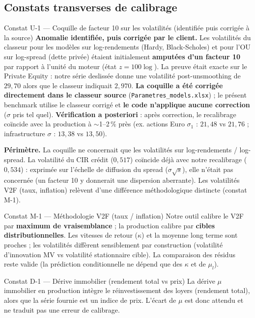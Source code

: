 \documentclass[11pt,a4paper]{article}
\begin{document}
\subsection{Constats transverses de calibrage}
\begin{findingbox}{Constat U-1 --- Coquille de facteur 10 sur les volatilit\'es (identifi\'ee puis corrig\'ee \`a la source)}
\textbf{Anomalie identifi\'ee, puis corrig\'ee par le client.} Les volatilit\'es
du classeur pour les mod\`eles sur log-rendements (Hardy, Black-Scholes) et pour
l'OU sur log-spread (dette priv\'ee) \'etaient initialement \textbf{amput\'ees
d'un facteur 10} par rapport \`a l'unit\'e du moteur (\'etat $z=100\log$). La
preuve \'etait exacte sur le Private Equity : notre s\'erie deslissée donne une
volatilit\'e post-unsmoothing de $29{,}70$ alors que le classeur indiquait
$2{,}970$. \textbf{La coquille a \'et\'e corrig\'ee directement dans le classeur
source} (\texttt{Parametres\_models.xlsx}) ; le pr\'esent benchmark utilise le
classeur corrig\'e et \textbf{le code n'applique aucune correction}
($\sigma$ pris tel quel). \textbf{V\'erification a posteriori} : apr\`es
correction, le recalibrage co\"incide avec la production \`a $\sim$1--2\,\%
pr\`es (ex. actions Euro $\sigma_1$ : $21{,}48$ vs $21{,}76$ ; infrastructure
$\sigma$ : $13{,}38$ vs $13{,}50$).

\textbf{Périm\`etre.} La coquille ne concernait que les volatilit\'es sur
log-rendements / log-spread. La volatilit\'e du CIR cr\'edit ($0{,}517$)
co\"incide d\'ej\`a avec notre recalibrage ($0{,}534$) : exprim\'ee sur
l'\'echelle de diffusion du spread ($\sigma\sqrt{s}$), elle n'\'etait pas
concern\'ee (un facteur 10 y donnerait une dispersion aberrante). Les
volatilit\'es V2F (taux, inflation) rel\`event d'une diff\'erence
m\'ethodologique distincte (constat M-1).
\end{findingbox}
\begin{findingbox}{Constat M-1 --- M\'ethodologie V2F (taux / inflation)}
Notre outil calibre le V2F par \textbf{maximum de vraisemblance} ; la production
calibre par \textbf{cibles distributionnelles}. Les vitesses de retour
($\kappa$) et la moyenne long terme sont proches ; les volatilit\'es
diff\`erent sensiblement par construction (volatilit\'e d'innovation MV vs
volatilit\'e stationnaire cible). La comparaison des r\'esidus reste valide
(la pr\'ediction conditionnelle ne d\'epend que des $\kappa$ et de $\mu_l$).
\end{findingbox}
\begin{findingbox}{Constat D-1 --- Dérive immobilier (rendement total vs prix)}
La d\'erive $\mu$ immobilier en production int\`egre le r\'einvestissement des
loyers (rendement total), alors que la s\'erie fournie est un indice de prix.
L'\'ecart de $\mu$ est donc attendu et ne traduit pas une erreur de calibrage.
\end{findingbox}
\end{document}
